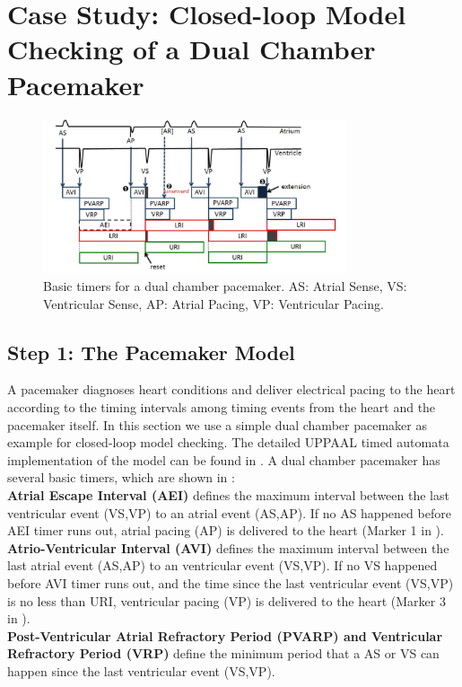 \section{Case Study: Closed-loop Model Checking of a Dual Chamber Pacemaker}
\label{caseStudy}
\begin{figure}[!t]
	\centering
	\includegraphics[width=0.8\textwidth]{figs/PM_timers.pdf}
	\caption{\small Basic timers for a dual chamber pacemaker. AS: Atrial Sense, VS: Ventricular Sense, AP: Atrial Pacing, VP: Ventricular Pacing.}
	\vspace{-10pt}
	\label{fig:PM_timers}
\end{figure}

\subsection{Step 1: The Pacemaker Model}
A pacemaker diagnoses heart conditions and deliver electrical pacing to the heart according to the timing intervals among timing events from the heart and the pacemaker itself. In this section we use a simple dual chamber pacemaker as example for closed-loop model checking. The detailed UPPAAL timed automata implementation of the model can be found in \cite{sttt13}. A dual chamber pacemaker has several basic timers, which are shown in :\\
\textbf{Atrial Escape Interval (AEI)} defines the maximum interval between the last ventricular event (VS,VP) to an atrial event (AS,AP). If no AS happened before AEI timer runs out, atrial pacing (AP) is delivered to the heart (Marker 1 in ). \\
\textbf{Atrio-Ventricular Interval (AVI)} defines the maximum interval between the last atrial event (AS,AP) to an ventricular event (VS,VP). If no VS happened before AVI timer runs out, and the time since the last ventricular event (VS,VP) is no less than URI, ventricular pacing (VP) is delivered to the heart (Marker 3 in ).\\
\textbf{Post-Ventricular Atrial Refractory Period (PVARP) and Ventricular Refractory Period (VRP)} define the minimum period that a AS or VS can happen since the last ventricular event (VS,VP). 

